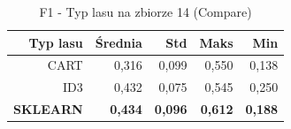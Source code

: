 \begin{table}[htbp]
\centering
\small
\setlength{\tabcolsep}{6pt}
\renewcommand{\arraystretch}{1.2}
\caption{F1 - Typ lasu na zbiorze 14 (Compare)}
\label{tab:Compare_on_14_f1}
\begin{tabular}{r|r|r|r|r}
\toprule
Typ lasu & Średnia & Std & Maks & Min \\
\hline
CART & 0,316 & 0,099 & 0,550 & 0,138 \\
ID3 & 0,432 & 0,075 & 0,545 & 0,250 \\
\textbf{SKLEARN} & \textbf{0,434} & \textbf{0,096} & \textbf{0,612} & \textbf{0,188} \\
\bottomrule
\end{tabular}
\end{table}
